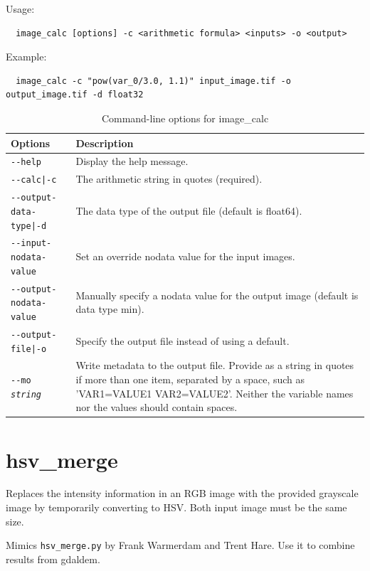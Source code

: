 Usage:
\begin{verbatim}
  image_calc [options] -c <arithmetic formula> <inputs> -o <output>
\end{verbatim}

Example:
\begin{verbatim}
  image_calc -c "pow(var_0/3.0, 1.1)" input_image.tif -o output_image.tif -d float32
\end{verbatim}

\medskip

\begin{longtable}{|l|p{10cm}|}
\caption{Command-line options for image\_calc}
\label{tbl:imagecalc}
\endfirsthead
\endhead
\endfoot
\endlastfoot
\hline
Options & Description \\ \hline \hline
\texttt{-\/-help} & Display the help message.\\ \hline
\texttt{-\/-calc|-c} & The arithmetic string in quotes (required).\\ \hline
\texttt{-\/-output-data-type|-d} & The data type of the output file (default is float64).\\ \hline
\texttt{-\/-input-nodata-value} & Set an override nodata value for the input images.\\ \hline
\texttt{-\/-output-nodata-value} & Manually specify a nodata value for the output image (default is data type min).\\ \hline
\texttt{-\/-output-file|-o} & Specify the output file instead of using a default.\\ \hline
\texttt{-\/-mo \textit{string}} & Write metadata to the output file. Provide as a string in quotes if more than one item, separated by a space, such as 'VAR1=VALUE1 VAR2=VALUE2'. Neither the variable names nor the values should contain spaces. \\ \hline
\end{longtable}

\section{hsv\_merge}
\label{hsvmerge}

Replaces the intensity information in an RGB image with the provided grayscale image
by temporarily converting to HSV.  Both input image must be the same size.

Mimics \texttt{hsv\_merge.py} by Frank Warmerdam and Trent Hare. Use it to combine results from gdaldem.

\medskip

